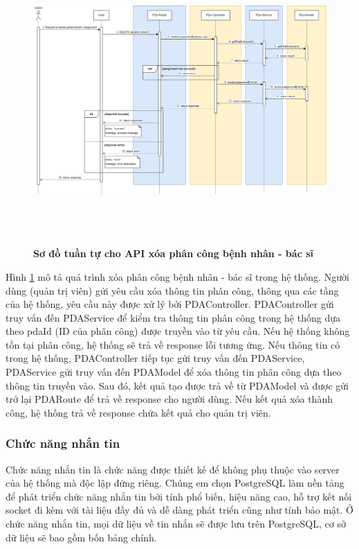 \begin{figure}[H]
  \centering
  \includegraphics[width=16cm,height=11cm]{Images/sequence_api/deleteAssignment.png}
  \caption[Sơ đồ tuần tự cho API xóa phân công bệnh nhân - bác sĩ]{\bfseries \fontsize{12pt}{0pt}
  \selectfont Sơ đồ tuần tự cho API xóa phân công bệnh nhân - bác sĩ }
  \label{api_deletePDA} %
\end{figure}
Hình \ref{api_deletePDA} mô tả quá trình xóa phân công bệnh nhân - bác sĩ trong hệ thống. Người dùng (quản trị viên) gửi yêu cầu xóa thông tin phân công, thông qua các tầng của hệ thống, 
yêu cầu này được xử lý bởi PDAController. PDAController gửi truy vấn đến PDAService để kiểm tra thông tin phân công trong hệ thống dựa theo pdaId (ID của phân công) được truyền vào từ yêu cầu. 
Nếu hệ thống không tồn tại phân công, hệ thống sẽ trả về response lỗi tương ứng. Nếu thông tin có trong hệ thống, PDAController tiếp tục gửi truy vấn đến PDAService, PDAService gửi truy vấn đến PDAModel để xóa thông tin phân công 
dựa theo thông tin truyền vào. Sau đó, kết quả tạo được trả về từ PDAModel và được gửi trở lại PDARoute để trả về response cho người dùng. Nếu kết quả xóa thành công, hệ thống trả về response chứa kết quả cho quản trị viên. 
\subsubsection{Chức năng nhắn tin}
Chức năng nhắn tin là chức năng được thiết kế để không phụ thuộc vào server của
hệ thống mà độc lập đứng riêng. Chúng em chọn PostgreSQL làm nền tảng để phát triển
chức năng nhắn tin bởi tính phổ biến, hiệu năng cao, hỗ trợ kết nối socket đi kèm với tài liệu đầy
đủ và dễ dàng phát triển cũng như tính bảo mật. Ở chức năng nhắn tin, mọi dữ liệu về tin nhắn sẽ được lưu trên
PostgreSQL, cơ sở dữ liệu sẽ bao gồm bốn bảng chính.

